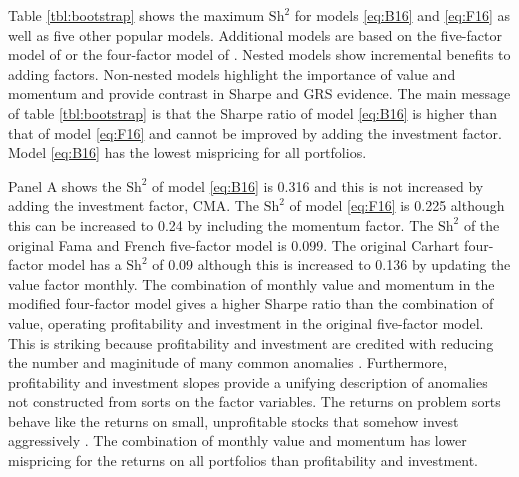 

Table \ref{tbl:bootstrap} shows the maximum $\text{Sh}^2$ for models
\ref{eq:B16} and \ref{eq:F16} as well as five other popular models.
Additional models are based on the five-factor model of \textcite{fama2015five}
or the four-factor model of \textcite{carhart1997persistence}.
Nested models show incremental benefits to adding factors.
Non-nested models highlight the importance of value and momentum
and provide contrast in Sharpe and GRS evidence.
The main message of table \ref{tbl:bootstrap} is that the Sharpe ratio of
model \ref{eq:B16} is higher than that of model \ref{eq:F16} and
cannot be improved by adding the investment factor.
Model \ref{eq:B16} has the lowest mispricing for all portfolios.

Panel A shows the $\text{Sh}^2$ of model \ref{eq:B16} is 0.316 and this
is not increased by adding the investment factor, CMA.
The $\text{Sh}^2$ of model \ref{eq:F16} is 0.225 although this can be
increased to 0.24 by including the momentum factor.
The $\text{Sh}^2$ of the original Fama and French five-factor model is 0.099.
The original Carhart four-factor model has a $\text{Sh}^2$ of 0.09 although
this is increased to 0.136 by updating the value factor monthly.
The combination of monthly value and momentum in the modified four-factor
model gives a higher Sharpe ratio than the combination of value, operating
profitability and investment in the original five-factor model.
This is striking because profitability and investment are credited with
reducing the number and maginitude of many common anomalies
\parencite{fama2015five}.
Furthermore, profitability and investment slopes provide a unifying description
of anomalies not constructed from sorts on the factor variables.
The returns on problem sorts behave like the returns on small,
unprofitable stocks that somehow invest aggressively
\parencite{fama2016dissecting}.
The combination of monthly value and momentum has lower mispricing for
the returns on all portfolios than profitability and investment.

